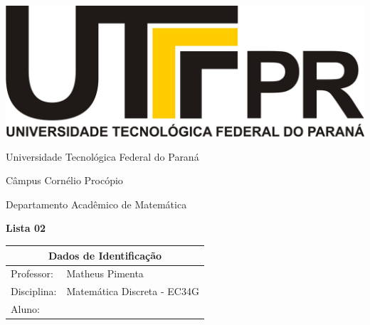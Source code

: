 \documentclass[oneside,a4paper,12pt]{article}
\newcommand{\universidade}{Universidade Tecnológica Federal do Paraná}
\newcommand{\centro}{Câmpus Cornélio Procópio}
\newcommand{\departamento}{Departamento Acadêmico de Matemática}
\newcommand{\curso}{Engenharia da Computação}
\newcommand{\professores}{Matheus Pimenta}
\newcommand{\disciplina}{Matemática Discreta - EC34G}
\begin{document}
	\pagestyle{empty}
	
	\begin{center}
		\includegraphics[width=\linewidth/8]{logo.jpg}%
	 	\vspace{2pt} 	
		
		\universidade
		\par
		\centro
		\par
		\departamento
		\par
		\par
		\vspace{12pt}
		\LARGE \textbf{Lista 02}
		
	\end{center}
	
	\vspace{12pt}
	
	\begin{tabular}{ |l|p{12cm}| }
		
		\hline
		\multicolumn{2}{|c|}{\textbf{Dados de Identificação}} \\
		\hline
		Professor:         &    \professores           \\
		\hline
		Disciplina:        &    \disciplina          \\
		\hline
		Aluno:             &                   \\
		\hline
		
	\end{tabular}
	\vspace{6pt}
	
	
	\begin{snugshade}
	\end{snugshade}
\end{document}
